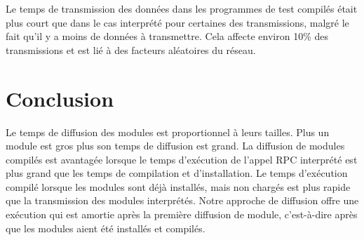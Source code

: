 Le temps de transmission des données dans les programmes de test compilés était
plus court que dans le cas interprété pour certaines des transmissions, malgré
le fait qu'il y a moins de données à transmettre. Cela affecte environ 10\% des
transmissions et est lié à des facteurs aléatoires du réseau.

\section {Conclusion}

Le temps de diffusion des modules est proportionnel à leurs tailles.  Plus un
module est gros plus son temps de diffusion est grand.  La diffusion de modules
compilés est avantagée lorsque le temps d'exécution de l'appel RPC interprété
est plus grand que les temps de compilation et d'installation. Le temps
d'exécution compilé lorsque les modules sont déjà installés, mais non chargés
est plus rapide que la transmission des modules interprétés.  Notre approche de
diffusion offre une exécution qui est amortie après la première diffusion de module,
c'est-à-dire après que les modules aient été installés et compilés.





